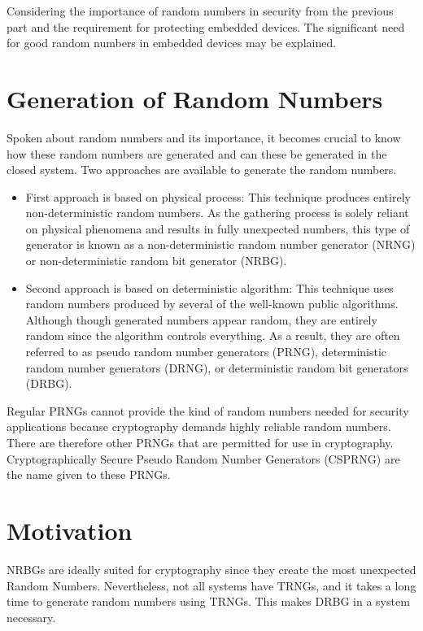 Considering the importance of random numbers in security from the previous part and the requirement for protecting embedded devices. The significant need for good random numbers in embedded devices may be explained.

%
%
\section{Generation of Random Numbers}
\label{sec:intro:Generation of Random Numbers}

Spoken about random numbers and its importance, it becomes crucial to know how these random numbers are generated and can these be generated in the closed system. Two approaches are available to generate the random numbers.

\begin{itemize}
	\item First approach is based on physical process: This technique produces entirely non-deterministic random numbers. As the gathering process is solely reliant on physical phenomena and results in fully unexpected numbers, this type of generator is known as a non-deterministic random number generator (NRNG) or non-deterministic random bit generator (NRBG).
	\item Second approach is based on deterministic algorithm:  This technique uses random numbers produced by several of the well-known public algorithms. Although though generated numbers appear random, they are entirely random since the algorithm controls everything. As a result, they are often referred to as pseudo random number generators (PRNG), deterministic random number generators (DRNG), or deterministic random bit generators (DRBG).
\end{itemize}

Regular PRNGs cannot provide the kind of random numbers needed for security applications because cryptography demands highly reliable random numbers. There are therefore other PRNGs that are permitted for use in cryptography. Cryptographically Secure Pseudo Random Number Generators (CSPRNG) are the name given to these PRNGs. 

%
%
\section{Motivation}
\label{sec:intro:structure}

NRBGs are ideally suited for cryptography since they create the most unexpected Random Numbers. Nevertheless, not all systems have TRNGs, and it takes a long time to generate random numbers using TRNGs. This makes DRBG in a system necessary. 

